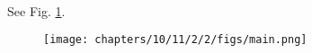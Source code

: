 	\\
	\solution See Fig. 
		\ref{fig:10/11/2/2}.
	\begin{figure}[H]
		\centering
 \texttt{[image: chapters/10/11/2/2/figs/main.png]}
		\caption{}
		\label{fig:10/11/2/2}
  	\end{figure}

